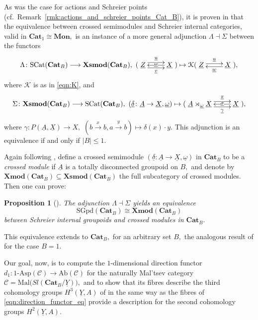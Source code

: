 \documentclass[11pt]{amsart}
\theoremstyle{plain}
\newtheorem{proposition}[subsubsection]{Proposition}
\theoremstyle{definition}
\theoremstyle{remark}
\newcommand{\un}{\underline}
\begin{document}
As was the case for actions and Schreier points (cf.~Remark~\ref{rmk:actions_and_schreier_points_Cat_B}), it is proven in \cite{a1} that the equivalence between crossed semimodules and Schreier internal categories, valid in $\mathbf{Cat}_1\cong\mathbf{Mon},$ is an instance of a more general adjunction $\Lambda\dashv\Sigma$ between the functors
\begin{equation*}
\Lambda\colon\mathrm{SCat}(\mathbf{Cat}_B)\longrightarrow\mathbf{Xsmod}(\mathbf{Cat}_B), \ (\xymatrix{{\un{Z}} \ar@<.9ex>[r]^-{\un{u}} \ar@<-.9ex>[r]_-{\un{v}} &{\un{X}} \ar[l]|-{\un{w}}})\mapsto \mathcal{K}(\xymatrix{{\un{Z}} \ar@<.5ex>[r]^-{\un{u}} &{\un{X}} \ar@<.5ex>[l]^-{\un{w}}}),
\end{equation*}
where $\mathcal{K}$ is as in \eqref{eqn:K}, and
\begin{equation}
\label{eqn:Sigma}
\Sigma\colon\mathbf{Xsmod}(\mathbf{Cat}_B)\longrightarrow\mathrm{SCat}(\mathbf{Cat}_B), \ (\un{\delta}\colon\un{A}\rightarrow\un{X},\un{\omega})\mapsto (\xymatrix{{\un{A}\rtimes_{\un{\omega}}\un{X}} \ar@<.9ex>[r]^-{\un{\pi}} \ar@<-.9ex>[r]_-{\un{\gamma}} &{\un{X}} \ar[l]|-{\un{\sigma}}}),
\end{equation}
where $\gamma\colon P(\un{A},\un{X})\rightarrow X,$ $(b\xrightarrow{x} b,a\xrightarrow{y} b)\mapsto\delta(x)\cdot y.$ This adjunction is an equivalence if and only if $|B|\leq1.$

Again following \cite{a1}, define a crossed semimodule $(\un{\delta}\colon\un{A}\rightarrow\un{X},\un{\omega})$ in $\mathbf{Cat}_B$ to be a \emph{crossed module} if $\un{A}$ is a totally disconnected groupoid on $B,$ and denote by $\mathbf{Xmod}(\mathbf{Cat}_B)\subseteq\mathbf{Xsmod}(\mathbf{Cat}_B)$ the full subcategory of crossed modules. Then one can prove:
\begin{proposition}[\cite{a1}]
\label{prop:scat_xmod}
The adjunction $\Lambda\dashv\Sigma$ yields an equivalence
\begin{equation*}
\mathrm{SGpd}(\mathbf{Cat}_B)\cong\mathbf{Xmod}(\mathbf{Cat}_B)
\end{equation*}
between Schreier internal groupoids and crossed modules in $\mathbf{Cat}_B.$
\end{proposition}
This equivalence extends to $\mathbf{Cat}_B,$ for an arbitrary set $B,$ the analogous result of \cite{crossed-semimodules} for the case $B=1.$

Our goal, now, is to compute the $1$-dimensional direction functor $d_1\colon 1\text{-}\mathrm{Asp}(\mathcal{C})\rightarrow\mathrm{Ab}(\mathcal{C})$ for the naturally Mal'tsev category $\mathcal{C}=\mathrm{Mal}\big(Sl(\mathbf{Cat}_B/\un{Y})\big),$ and to show that its fibres describe the third cohomology groups $H^3(\un{Y},A)$ of \cite{golasinski} in the same way as the fibres of \eqref{eqn:direction_functor_eq} provide a description for the second cohomology groups $H^2(\un{Y},A).$
\end{document}
